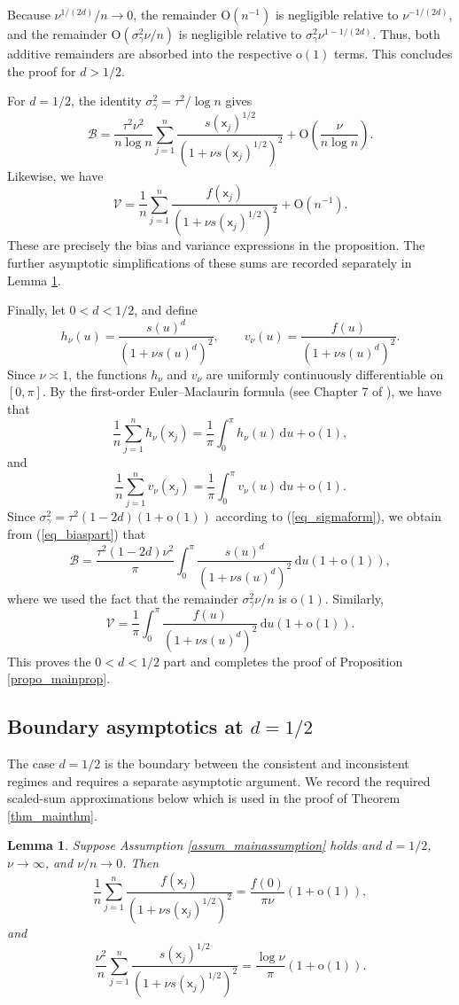 \documentclass[11pt]{article}
\newtheorem{lemma}[theorem]{Lemma}
\newcommand{\OO}{\mathrm{O}}
\newcommand{\oo}{\mathrm{o}}
\newcommand{\sfx}{\mathsf{x}}
\numberwithin{equation}{section}
\numberwithin{figure}{section}
\begin{document}
Because \(\nu^{1/(2d)}/n\to0\), the remainder
\(\mathrm{O}(n^{-1})\) is negligible relative to
\(\nu^{-1/(2d)}\), and the remainder
\(\mathrm{O}(\sigma_\gamma^2\nu/n)\) is negligible relative to
\(\sigma_\gamma^2\nu^{1-1/(2d)}\). Thus, both additive remainders are
absorbed into the respective \(\mathrm{o}(1)\) terms. This concludes the proof for $d>1/2.$


For \(d=1/2\), the identity
\(\sigma_\gamma^2=\tau^2/\log n\) gives
\[
\mathcal{B}
=\frac{\tau^2\nu^2}{n\log n}
\sum_{j=1}^n
\frac{s(\sfx_j)^{1/2}}
{(1+\nu s(\sfx_j)^{1/2})^2}
+\OO\left(\frac{\nu}{n\log n}\right).
\]
Likewise, we have 
\[
\mathcal{V}
=\frac{1}{n}\sum_{j=1}^n
\frac{f(\sfx_j)}
{(1+\nu s(\sfx_j)^{1/2})^2}
+\OO(n^{-1}).
\]
These are precisely the bias and variance expressions in the
proposition. The further asymptotic simplifications of these sums are
recorded separately in Lemma \ref{lemma_boundary_scaled_sums}.

Finally, let \(0<d<1/2\), and define
\[
h_\nu(u)=\frac{s(u)^d}{(1+\nu s(u)^d)^2},
\qquad
v_\nu(u)=\frac{f(u)}{(1+\nu s(u)^d)^2}.
\]
Since \(\nu\asymp1\), the functions \(h_\nu\) and \(v_\nu\) are uniformly
continuously differentiable on \([0,\pi]\). By the first-order
Euler--Maclaurin formula (see Chapter 7 of \cite{Apostol1974}), we have that 
\begin{equation*}
\frac{1}{n}\sum_{j=1}^n h_\nu(\sfx_j)
=
\frac{1}{\pi}\int_0^\pi h_\nu(u)\,\mathrm{d}u
+\mathrm{o}(1),
\end{equation*}
and
\begin{equation*}
\frac{1}{n}\sum_{j=1}^n v_\nu(\sfx_j)
=
\frac{1}{\pi}\int_0^\pi v_\nu(u)\,\mathrm{d}u
+\mathrm{o}(1).
\end{equation*}
Since \(\sigma_\gamma^2=\tau^2(1-2d)(1+\oo(1))\) according to (\ref{eq_sigmaform}), we obtain from (\ref{eq_biaspart}) that
\[
\mathcal{B}
=\frac{\tau^2(1-2d)\nu^2}{\pi}
\int_0^\pi
\frac{s(u)^d}{(1+\nu s(u)^d)^2}\,\mathrm{d}u
(1+\oo(1)),
\]
where we used the fact that the remainder \(\sigma_\gamma^2\nu/n\) is \(\mathrm{o}(1)\). Similarly,
\[
\mathcal{V}
=\frac{1}{\pi}\int_0^\pi
\frac{f(u)}{(1+\nu s(u)^d)^2}\,\mathrm{d}u
(1+\oo(1)).
\]
This proves the \(0<d<1/2\) part and completes the proof of Proposition \ref{propo_mainprop}.

\subsection{Boundary asymptotics at \(d=1/2\)}
The case \(d=1/2\) is the boundary between the consistent and inconsistent
regimes and requires a separate asymptotic argument. We record the required
scaled-sum approximations below which is used in the proof of Theorem \ref{thm_mainthm}.
\begin{lemma}\label{lemma_boundary_scaled_sums}
Suppose Assumption \ref{assum_mainassumption} holds and  \(d=1/2\), \(\nu\to\infty\), and \(\nu/n\to0\). Then
\[
\frac{1}{n}\sum_{j=1}^n
\frac{f(\sfx_j)}{(1+\nu s(\sfx_j)^{1/2})^2}
=\frac{f(0)}{\pi\nu}(1+\oo(1)),
\]
and
\[
\frac{\nu^2}{n}\sum_{j=1}^n
\frac{s(\sfx_j)^{1/2}}
{(1+\nu s(\sfx_j)^{1/2})^2}
=\frac{\log\nu}{\pi}(1+\oo(1)).
\]
\end{lemma}
\end{document}
